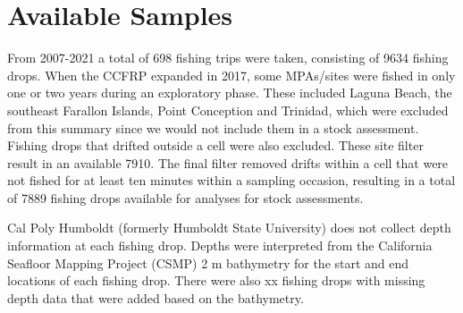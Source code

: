 \documentclass[
]{article}
\begin{document}
\hypertarget{available-samples}{%
\section{Available Samples}\label{available-samples}}

From 2007-2021 a total of 698 fishing trips
were taken, consisting of 9634 fishing drops. When the CCFRP
expanded in 2017, some MPAs/sites were fished in only one or two years during an
exploratory phase. These included Laguna Beach, the southeast Farallon Islands,
Point Conception and Trinidad, which were excluded from this summary since we
would not include them in a stock assessment.
Fishing drops that drifted outside a cell were also excluded. These site filter
result in an available 7910. The final filter removed
drifts within a cell that were not fished for at least ten minutes within a sampling
occasion, resulting in a total of 7889 fishing
drops available for analyses for stock assessments.

Cal Poly Humboldt (formerly Humboldt State University) does not collect depth
information at each fishing drop. Depths
were interpreted from the California Seafloor Mapping Project (CSMP) 2 m bathymetry
for the start and end locations of each fishing drop. There were also xx fishing
drops with missing depth data that were added based on the bathymetry.
\end{document}
